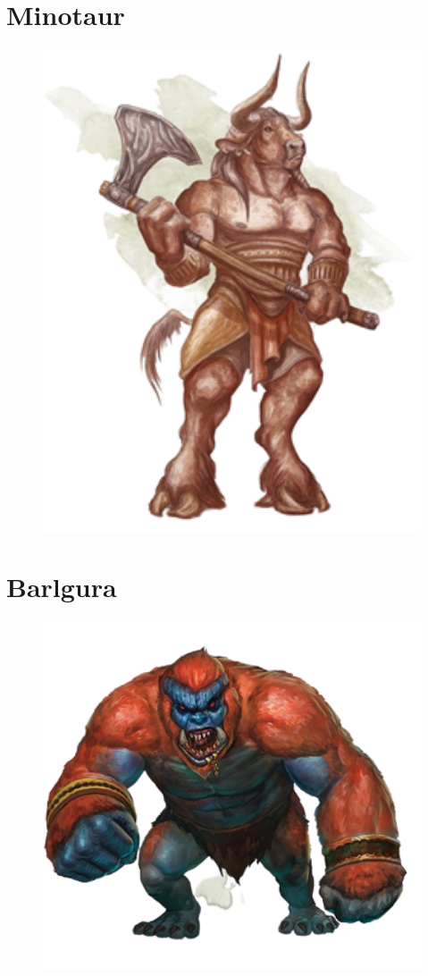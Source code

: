 \documentclass[oneside]{clgrammar}
\begin{document}
\section{Minotaur}
\begin{figure}[h!]
\centering
\includegraphics[width=350pt]{images/monstros/minotauroi-removebg-preview.png}
\end{figure}

\newpage

\section{Barlgura}
\begin{figure}[h!]
\centering
\includegraphics[width=350pt]{images/monstros/barlgura-removebg-preview.png}
\end{figure}
\end{document}

